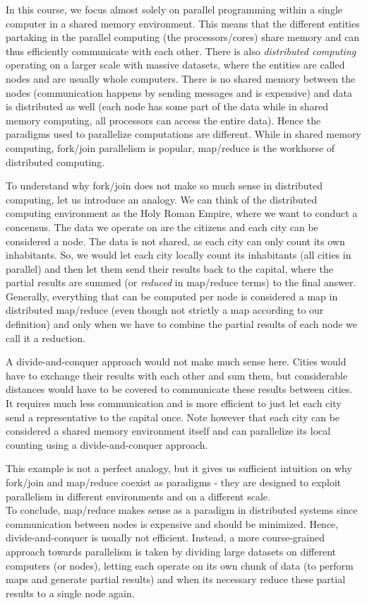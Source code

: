 \documentclass[main.tex]{subfiles}
\begin{document}
In this course, we focus almost solely on parallel programming within a single computer in a shared memory environment. This means that the different entities partaking in the parallel computing (the processors/cores) share memory and can thus efficiently communicate with each other. There is also \textit{distributed computing} operating on a larger scale with massive datasets, where the entities are called nodes and are usually whole computers. There is no shared memory between the nodes (communication happens by sending messages and is expensive) and data is distributed as well (each node has some part of the data while in shared memory computing, all processors can access the entire data). Hence the paradigms used to parallelize computations are different. While in shared memory computing, fork/join parallelism is popular, map/reduce is the workhorse of distributed computing.

To understand why fork/join does not make so much sense in distributed computing, let us introduce an analogy. We can think of the distributed computing environment as the Holy Roman Empire, where we want to conduct a concensus. The data we operate on are the citizens and each city can be considered a node. The data is not shared, as each city can only count its own inhabitants. So, we would let each city locally count its inhabitants (all cities in parallel) and then let them send their results back to the capital, where the partial results are summed (or \textit{reduced} in map/reduce terms) to the final answer. Generally, everything that can be computed per node is considered a map in distributed map/reduce (even though not strictly a map according to our definition) and only when we have to combine the partial results of each node we call it a reduction.

A divide-and-conquer approach would not make much sense here. Cities would have to exchange their results with each other and sum them, but considerable distances would have to be covered to communicate these results between cities. It requires much less communication and is more efficient to just let each city send a representative to the capital once. Note however that each city can be considered a shared memory environment itself and can parallelize its local counting using a divide-and-conquer approach.

This example is not a perfect analogy, but it gives us sufficient intuition on why fork/join and map/reduce coexist as paradigms - they are designed to exploit parallelism in different environments and on a different scale.\\[3mm]
To conclude, map/reduce makes sense as a paradigm in distributed systems since communication between nodes is expensive and should be minimized. Hence, divide-and-conquer is usually not efficient. Instead, a more course-grained approach towards parallelism is taken by dividing large datasets on different computers (or nodes), letting each operate on its own chunk of data (to perform maps and generate partial results) and when its necessary reduce these partial results to a single node again.
\end{document}

